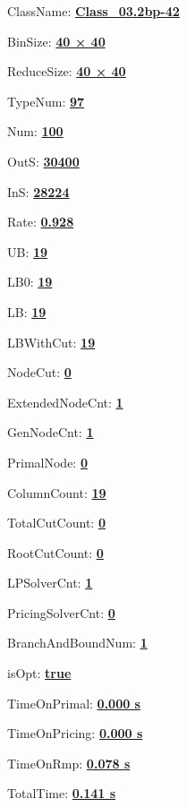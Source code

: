 \documentclass[11pt]{article}
\begin{document}
\pagestyle{empty}


ClassName: \underline{\textbf{Class_03.2bp-42}}
\par
BinSize: \underline{\textbf{40 × 40}}
\par
ReduceSize: \underline{\textbf{40 × 40}}
\par
TypeNum: \underline{\textbf{97}}
\par
Num: \underline{\textbf{100}}
\par
OutS: \underline{\textbf{30400}}
\par
InS: \underline{\textbf{28224}}
\par
Rate: \underline{\textbf{0.928}}
\par
UB: \underline{\textbf{19}}
\par
LB0: \underline{\textbf{19}}
\par
LB: \underline{\textbf{19}}
\par
LBWithCut: \underline{\textbf{19}}
\par
NodeCut: \underline{\textbf{0}}
\par
ExtendedNodeCnt: \underline{\textbf{1}}
\par
GenNodeCnt: \underline{\textbf{1}}
\par
PrimalNode: \underline{\textbf{0}}
\par
ColumnCount: \underline{\textbf{19}}
\par
TotalCutCount: \underline{\textbf{0}}
\par
RootCutCount: \underline{\textbf{0}}
\par
LPSolverCnt: \underline{\textbf{1}}
\par
PricingSolverCnt: \underline{\textbf{0}}
\par
BranchAndBoundNum: \underline{\textbf{1}}
\par
isOpt: \underline{\textbf{true}}
\par
TimeOnPrimal: \underline{\textbf{0.000 s}}
\par
TimeOnPricing: \underline{\textbf{0.000 s}}
\par
TimeOnRmp: \underline{\textbf{0.078 s}}
\par
TotalTime: \underline{\textbf{0.141 s}}
\par
\newpage


\end{document}
